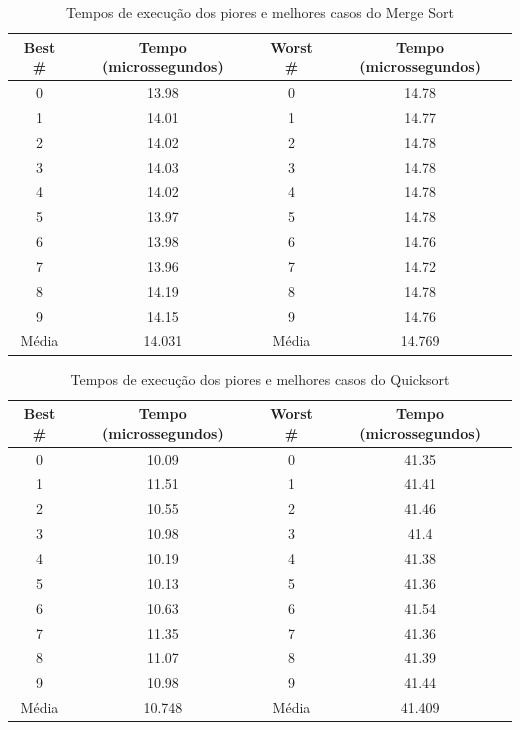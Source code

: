 \documentclass[10pt,a4paper]{article}
\begin{document}
\begin{center}
\begin{table}
\begin{tabular}{| c | c | c | c |}
\hline
Best \# & Tempo (microssegundos) & Worst \# & Tempo (microssegundos) \\ \hline 
0 & 13.98 & 0 & 14.78 \\ \hline 
1 & 14.01 & 1 & 14.77 \\ \hline 
2 & 14.02 & 2 & 14.78 \\ \hline 
3 & 14.03 & 3 & 14.78 \\ \hline 
4 & 14.02 & 4 & 14.78 \\ \hline 
5 & 13.97 & 5 & 14.78 \\ \hline 
6 & 13.98 & 6 & 14.76 \\ \hline 
7 & 13.96 & 7 & 14.72 \\ \hline 
8 & 14.19 & 8 & 14.78 \\ \hline 
9 & 14.15 & 9 & 14.76 \\ \hline 
Média & 14.031 & Média & 14.769 \\ \hline 
\end{tabular}
\caption{Tempos de execução dos piores e melhores casos do Merge Sort}
\label{table:merge_worst_best}
\end{table}
\end{center}


\begin{center}
\begin{table}
\begin{tabular}{| c | c | c | c |}
\hline
Best \# & Tempo (microssegundos) & Worst \# & Tempo (microssegundos) \\ \hline 
0 & 10.09 & 0 & 41.35 \\ \hline 
1 & 11.51 & 1 & 41.41 \\ \hline 
2 & 10.55 & 2 & 41.46 \\ \hline 
3 & 10.98 & 3 & 41.4 \\ \hline 
4 & 10.19 & 4 & 41.38 \\ \hline 
5 & 10.13 & 5 & 41.36 \\ \hline 
6 & 10.63 & 6 & 41.54 \\ \hline 
7 & 11.35 & 7 & 41.36 \\ \hline 
8 & 11.07 & 8 & 41.39 \\ \hline 
9 & 10.98 & 9 & 41.44 \\ \hline 
Média & 10.748 & Média & 41.409 \\ \hline 
\end{tabular}
\caption{Tempos de execução dos piores e melhores casos do Quicksort}
\label{table:quick_worst_best}
\end{table}
\end{center}
\end{document}
